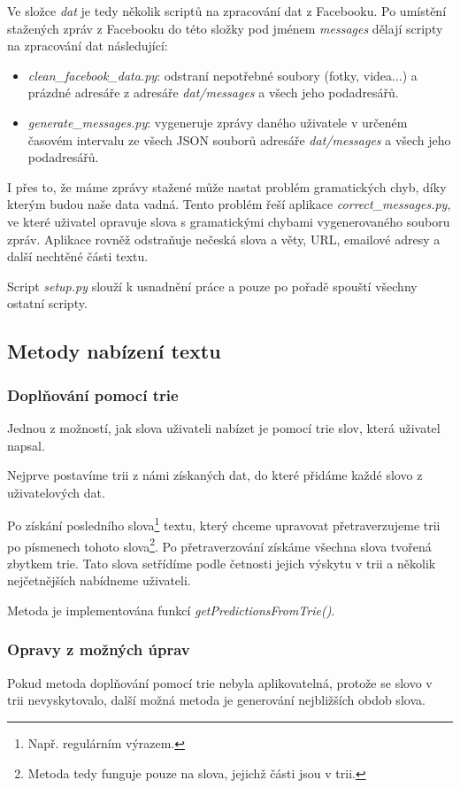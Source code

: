 \documentclass[a4paper, 12pt]{article}
\begin{document}
  Ve složce \textit{dat} je tedy několik scriptů na zpracování dat z Facebooku. Po umístění stažených zpráv z Facebooku do této složky pod jménem \textit{messages} dělají scripty na zpracování dat následující:
  \begin{itemize}
    \item \textit{clean\_facebook\_data.py}: odstraní nepotřebné soubory (fotky, videa...) a prázdné adresáře z adresáře \textit{dat/messages} a všech jeho podadresářů.
    \item \textit{generate\_messages.py}: vygeneruje zprávy daného uživatele v určeném časovém intervalu ze všech JSON souborů adresáře \textit{dat/messages} a všech jeho podadresářů.
  \end{itemize}

  I přes to, že máme zprávy stažené může nastat problém gramatických chyb, díky kterým budou naše data vadná. Tento problém řeší aplikace \textit{correct\_messages.py}, ve které uživatel opravuje slova s gramatickými chybami vygenerovaného souboru zpráv. Aplikace rovněž odstraňuje nečeská slova a věty, URL, emailové adresy a další nechtěné části textu.

  Script \textit{setup.py} slouží k usnadnění práce a pouze po pořadě spouští všechny ostatní scripty.

  \subsection{Metody nabízení textu}

  \subsubsection{Doplňování pomocí trie}
  Jednou z možností, jak slova uživateli nabízet je pomocí trie slov, která uživatel napsal.

  Nejprve postavíme trii z námi získaných dat, do které přidáme každé slovo z uživatelových dat.

  Po získání posledního slova\footnote{Např. regulárním výrazem.} textu, který chceme upravovat přetraverzujeme trii po písmenech tohoto slova\footnote{Metoda tedy funguje pouze na slova, jejichž části jsou v trii.}. Po přetraverzování získáme všechna slova tvořená zbytkem trie. Tato slova setřídíme podle četnosti jejich výskytu v trii a několik nejčetnějších nabídneme uživateli.

  Metoda je implementována funkcí \textit{getPredictionsFromTrie()}.

  \subsubsection{Opravy z možných úprav}
  Pokud metoda doplňování pomocí trie nebyla aplikovatelná, protože se slovo v trii nevyskytovalo, další možná metoda je generování nejbližších obdob slova.
\end{document}
